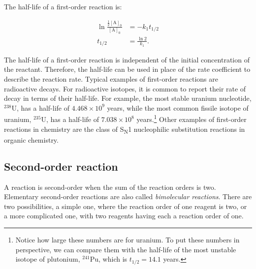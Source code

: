\documentclass[
  9pt,
]{extbook}
\theoremstyle{definition}
\theoremstyle{definition}
\theoremstyle{definition}
\theoremstyle{definition}
\theoremstyle{remark}
\begin{document}
The half-life of a first-order reaction is:

\begin{equation}
\begin{aligned}
\ln \frac{\frac{1}{2}[\mathrm{A}]_0}{[\mathrm{A}]_0}&=-k_1 t_{1/2}\\
t_{1/2} &= \frac{\ln 2}{k_1}.
\end{aligned}
\label{eq:kin8}
\end{equation}

The half-life of a first-order reaction is independent of the initial concentration of the reactant. Therefore, the half-life can be used in place of the rate coefficient to describe the reaction rate. Typical examples of first-order reactions are radioactive decays. For radioactive isotopes, it is common to report their rate of decay in terms of their half-life. For example, the most stable uranium nucleotide, \(^{238}\mathrm{U}\), has a half-life of \(4.468\times 10^9\) years, while the most common fissile isotope of uranium, \(^{235}\mathrm{U}\), has a half-life of \(7.038\times 10^8\) years.\footnote{Notice how large these numbers are for uranium. To put these numbers in perspective, we can compare them with the half-life of the most unstable isotope of plutonium, \(^{241}\mathrm{Pu}\), which is \(t_{1/2}=14.1\) years.} Other examples of first-order reactions in chemistry are the class of S\textsubscript{N}1 nucleophilic substitution reactions in organic chemistry.

\subsection{Second-order reaction}\label{second-order-reaction}

A reaction is second-order when the sum of the reaction orders is two. Elementary second-order reactions are also called \emph{bimolecular reactions}. There are two possibilities, a simple one, where the reaction order of one reagent is two, or a more complicated one, with two reagents having each a reaction order of one.
\end{document}
